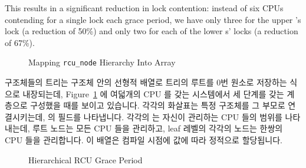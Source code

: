This results in a significant reduction in lock contention:
instead of six CPUs contending for a single lock each grace period,
we have only three for the upper 's lock
(a reduction of 50\%) and only
two for each of the lower s' locks (a reduction
of 67\%).
\fi

\begin{figure}[htb]
\centering
{}
\caption{Mapping {\tt rcu\_node} Hierarchy Into Array}
\label{fig:app:rcuimpl:rcutree:Mapping rcu-node Hierarchy Into Array}
\end{figure}

 구조체들의 트리는  구조체 안의 선형적 배열로 트리의
루트를 0번 원소로 저장하는 식으로 내장되는데,
Figure~\ref{fig:app:rcuimpl:rcutree:Mapping rcu-node Hierarchy Into Array} 에
여덟개의 CPU 를 갖는 시스템에서 세 단계를 갖는 계층으로 구성했을 때를 보이고
있습니다.
각각의 화살표는 특정  구조체를 그 부모로 연결시키는데,
 의   필드를 나타냅니다.
각각의  는 자신이 관리하는 CPU 들의 범위를 나타내는데, 루트 노드는
모든 CPU 들을 관리하고, leaf 레벨의 각각의 노드는 한쌍의 CPU 들을 관리합니다.
이 배열은 컴파일 시점에  값에 따라 정적으로 할당됩니다.
\iffalse

The tree of \co{rcu_node} structures is embedded into
a linear array in the \co{rcu_state} structure,
with the root of the tree in element zero, as shown in
Figure~\ref{fig:app:rcuimpl:rcutree:Mapping rcu-node Hierarchy Into Array}
for an eight-CPU
system with a three-level hierarchy.
Each arrow links a given \co{rcu_node} structure to its parent,
representing the \co{rcu_node}'s \co{->parent} field.
Each \co{rcu_node} indicates the range of CPUs covered,
so that the root node covers all of the CPUs, each node in the second
level covers half of the CPUs, and each node in the leaf level covering
a pair of CPUs.
This array is allocated statically at compile time based on the value
of \co{NR_CPUS}.
\fi

\begin{figure}[htbp]
\centering
{}
\caption{Hierarchical RCU Grace Period}
\label{fig:app:rcuimpl:rcutree:Hierarchical RCU Grace Period}
\end{figure}

